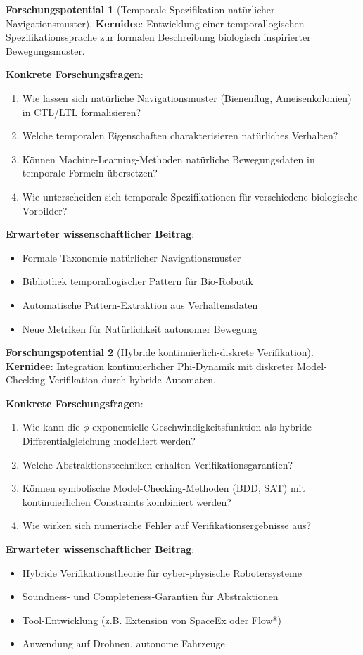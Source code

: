 ﻿\documentclass[a4paper,12pt]{article}
\theoremstyle{definition}
\newtheorem{potential}{Forschungspotential}[section]
\begin{document}
\begin{potential}[Temporale Spezifikation natürlicher Navigationsmuster]
\textbf{Kernidee}: Entwicklung einer temporallogischen Spezifikationssprache zur formalen Beschreibung biologisch inspirierter Bewegungsmuster.

\textbf{Konkrete Forschungsfragen}:
\begin{enumerate}
	\item Wie lassen sich natürliche Navigationsmuster (Bienenflug, Ameisenkolonien) in CTL/LTL formalisieren?
	\item Welche temporalen Eigenschaften charakterisieren natürliches Verhalten?
	\item Können Machine-Learning-Methoden natürliche Bewegungsdaten in temporale Formeln übersetzen?
	\item Wie unterscheiden sich temporale Spezifikationen für verschiedene biologische Vorbilder?
\end{enumerate}

\textbf{Erwarteter wissenschaftlicher Beitrag}:
\begin{itemize}
	\item Formale Taxonomie natürlicher Navigationsmuster
	\item Bibliothek temporallogischer Pattern für Bio-Robotik
	\item Automatische Pattern-Extraktion aus Verhaltensdaten
	\item Neue Metriken für Natürlichkeit autonomer Bewegung
\end{itemize}
\end{potential}

\begin{potential}[Hybride kontinuierlich-diskrete Verifikation]
\textbf{Kernidee}: Integration kontinuierlicher Phi-Dynamik mit diskreter Model-Checking-Verifikation durch hybride Automaten.

\textbf{Konkrete Forschungsfragen}:
\begin{enumerate}
	\item Wie kann die $\phi$-exponentielle Geschwindigkeitsfunktion als hybride Differentialgleichung modelliert werden?
	\item Welche Abstraktionstechniken erhalten Verifikationsgarantien?
	\item Können symbolische Model-Checking-Methoden (BDD, SAT) mit kontinuierlichen Constraints kombiniert werden?
	\item Wie wirken sich numerische Fehler auf Verifikationsergebnisse aus?
\end{enumerate}

\textbf{Erwarteter wissenschaftlicher Beitrag}:
\begin{itemize}
	\item Hybride Verifikationstheorie für cyber-physische Robotersysteme
	\item Soundness- und Completeness-Garantien für Abstraktionen
	\item Tool-Entwicklung (z.B. Extension von SpaceEx oder Flow*)
	\item Anwendung auf Drohnen, autonome Fahrzeuge
\end{itemize}
\end{potential}
\end{document}
